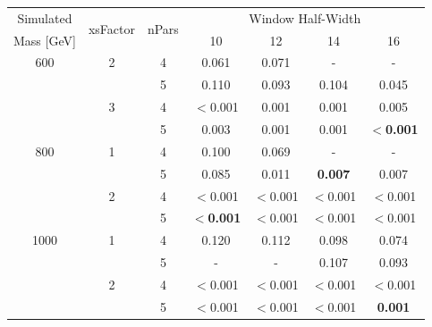 \begin{table}[!ht]
\centering
\begin{tabular}{|c|c|c||c|c|c|c|}
\hline
      Simulated      & \multirow{2}{*}{xsFactor} & \multirow{2}{*}{nPars} &\multicolumn{4}{c|}{Window Half-Width} \\ \cline{4-7} 
      Mass [GeV]     &                           &                        &      10        &      12        &      14        &      16        \\ \hline
       600           &            2              &           4            &   0.061    &   0.071    &     -      &     -      \\
                     &                           &           5            &   0.110    &   0.093    &   0.104    &   0.045    \\ \cline{2-7}
                     &            3              &           4            &   $<$0.001 &   0.001    &   0.001    &   0.005    \\
                     &                           &           5            &   0.003    &   0.001    &   0.001    &  \textbf{$<$0.001} \\ \hline
       800           &            1              &           4            &   0.100    &   0.069    &     -      &     -      \\
                     &                           &           5            &   0.085    &   0.011    &   \textbf{0.007}    &   0.007    \\ \cline{2-7}
                     &            2              &           4            &   $<$0.001 &   $<$0.001 &   $<$0.001 &   $<$0.001  \\
                     &                           &           5            &   \textbf{$<$0.001} &   $<$0.001 &   $<$0.001 &   $<$0.001  \\ \hline
      1000           &            1              &           4            &   0.120    &   0.112    &   0.098    &   0.074    \\
                     &                           &           5            &     -      &     -      &   0.107    &   0.093    \\ \cline{2-7}
                     &            2              &           4            &   $<$0.001 &   $<$0.001 &   $<$0.001 &   $<$0.001  \\
                     &                           &           5            &   $<$0.001 &   $<$0.001 &   $<$0.001 &   \textbf{0.001}    \\
\hline
\end{tabular}


\end{table}
